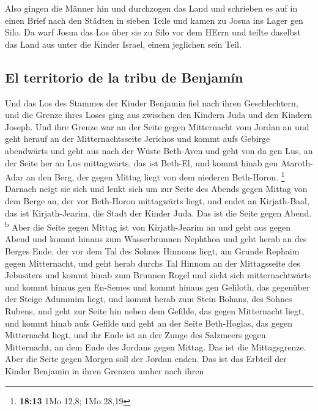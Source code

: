  Also gingen die Männer hin und durchzogen das Land und
schrieben es auf in einen Brief nach den Städten in sieben Teile und
kamen zu Josua ins Lager gen Silo.  Da warf Josua das Los
über sie zu Silo vor dem HErrn und teilte daselbst das Land aus unter
die Kinder Israel, einem jeglichen sein Teil.

\hypertarget{el-territorio-de-la-tribu-de-benjamuxedn}{%
\subsection{El territorio de la tribu de
Benjamín}\label{el-territorio-de-la-tribu-de-benjamuxedn}}

 Und das Los des Stammes der Kinder Benjamin fiel nach
ihren Geschlechtern, und die Grenze ihres Loses ging aus zwischen den
Kindern Juda und den Kindern Joseph.  Und ihre Grenze war
an der Seite gegen Mitternacht vom Jordan an und geht herauf an der
Mitternachtsseite Jerichos und kommt aufs Gebirge abendwärts und geht
aus nach der Wüste Beth-Aven  und geht von da gen Lus, an
der Seite her an Lus mittagwärts, das ist Beth-El, und kommt hinab gen
Ataroth-Adar an den Berg, der gegen Mittag liegt von dem niederen
Beth-Horon. \footnote{\textbf{18:13} 1Mo 12,8; 1Mo 28,19}
 Darnach neigt sie sich und lenkt sich um zur Seite des
Abends gegen Mittag von dem Berge an, der vor Beth-Horon mittagwärts
liegt, und endet an Kirjath-Baal, das ist Kirjath-Jearim, die Stadt der
Kinder Juda. Das ist die Seite gegen Abend. \textsuperscript{b}
 Aber die Seite gegen Mittag ist von Kirjath-Jearim an
und geht aus gegen Abend und kommt hinaus zum Wasserbrunnen Nephthoa
 und geht herab an des Berges Ende, der vor dem Tal des
Sohnes Hinnoms liegt, am Grunde Rephaim gegen Mitternacht, und geht
herab durchs Tal Hinnom an der Mittagsseite des Jebusiters und kommt
hinab zum Brunnen Rogel  und zieht sich mitternachtwärts
und kommt hinaus gen En-Semes und kommt hinaus gen Geliloth, das
gegenüber der Steige Adummim liegt, und kommt herab zum Stein Bohans,
des Sohnes Rubens,  und geht zur Seite hin neben dem
Gefilde, das gegen Mitternacht liegt, und kommt hinab aufs Gefilde
 und geht an der Seite Beth-Hoglas, das gegen Mitternacht
liegt, und ihr Ende ist an der Zunge des Salzmeers gegen Mitternacht, an
dem Ende des Jordans gegen Mittag. Das ist die Mittagsgrenze.
 Aber die Seite gegen Morgen soll der Jordan enden. Das
ist das Erbteil der Kinder Benjamin in ihren Grenzen umher nach ihren
